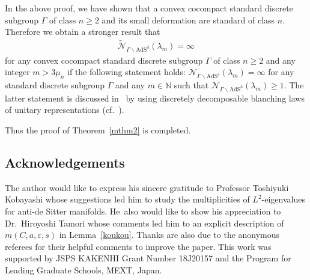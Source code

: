 \documentclass[10pt,a4paper]{amsart}
\numberwithin{equation}{section}
\begin{document}
\begin{Remark}
In the above proof, we have shown that a convex cocompact standard discrete subgroup
$\Gamma$ of class $n\geq 2$ and its small deformation are standard of class $n$.
Therefore we obtain a stronger result that
\begin{align*}
\widetilde{\mathcal{N}}_{\Gamma\backslash\mathrm{AdS}^{3}}(\lambda_{m})=\infty
\end{align*}
for any convex cocompact standard discrete subgroup
$\Gamma$ of class $n\geq 2$ and any integer $m>3\mu_{n}$
if the following statement holds:
$\mathcal{N}_{\Gamma\backslash\mathrm{AdS}^{3}}(\lambda_{m})=\infty$
for any standard discrete subgroup $\Gamma$ and any $m\in\mathbb{N}$ such that
$\mathcal{N}_{\Gamma\backslash\mathrm{AdS}^{3}}(\lambda_{m})\geq1$.
The latter statement is discussed in~\cite{AnaKaKob} by using discretely
decomposable blanching laws of unitary representations (cf.~\cite{KaKob19}).
\end{Remark}

Thus the proof of Theorem~\ref{mthm2} is completed.

\subsection*{Acknowledgements}
The author would like to express his sincere gratitude to
Professor Toshiyuki Kobayashi whose suggestions
led him to study the multiplicities of $L^2$-eigenvalues
for anti-de Sitter manifolds.
He~also would like to show his appreciation to Dr.\ Hiroyoshi Tamori
whose comments led him to an explicit description of $m(C,a,\varepsilon, s)$
in Lemma~\ref{koukou}.
Thanks are also due to the anonymous referees
for their helpful comments to improve the paper.
This work was supported by JSPS KAKENHI Grant Number 18J20157
and the Program for Leading Graduate Schools, MEXT, Japan.

\end{document}
